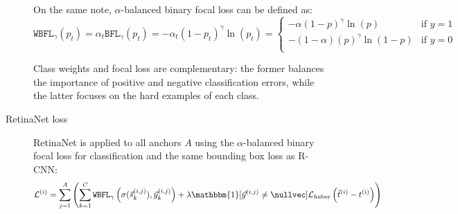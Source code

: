 \begin{description}
\begin{description}
                On the same note, $\alpha$-balanced binary focal loss can be defined as:
                \[ 
                    \texttt{WBFL}_\gamma(p_t) = 
                    \alpha_t \texttt{BFL}_\gamma(p_t) = 
                    -\alpha_t (1-p_t)^\gamma \ln(p_t) =
                    \begin{cases}
                        -\alpha (1-p)^\gamma \ln(p) & \text{if $y=1$} \\
                        -(1-\alpha) (p)^\gamma \ln(1-p) & \text{if $y=0$} \\
                    \end{cases}
                \]

                \begin{remark}
                    Class weights and focal loss are complementary: the former balances the importance of positive and negative classification errors, while the latter focuses on the hard examples of each class.
                \end{remark}

            \item[RetinaNet loss]
                RetinaNet is applied to all anchors $A$ using the $\alpha$-balanced binary focal loss for classification and the same bounding box loss as R-CNN:
                \[ \mathcal{L}^{(i)} = \sum_{j=1}^{A} \left( \sum_{k=1}^{C} \texttt{WBFL}_\gamma\left( \sigma(\vec{s}_k^{(i, j)}), \vec{y}_k^{(i, j)} \right) + \lambda \mathbbm{1}[\vec{y}^{(i, j)} \neq \nullvec] \mathcal{L}_\text{huber}\left(\hat{t}^{(i)} - t^{(i)} \right) \right) \]


\end{description}
\end{description}
